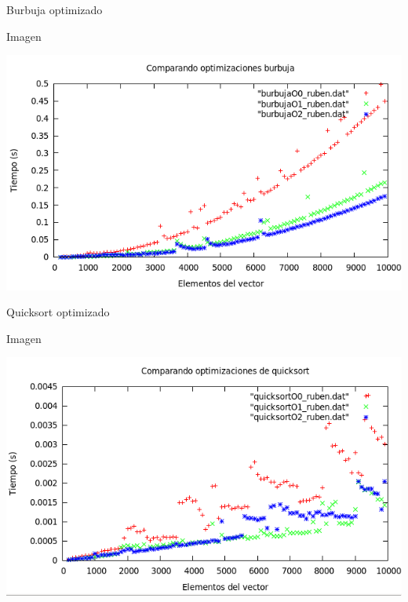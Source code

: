 \documentclass[compress]{beamer}
\begin{document}


\begin{frame}{Burbuja optimizado}
	\begin{alertblock}{Imagen}
	\begin{center}
	\includegraphics[scale=0.45]{../Graficas/Burbuja/burbuja_optimizacion.png}
	\end{center}
	\end{alertblock}
\end{frame}

\begin{frame}{Quicksort optimizado}
	\begin{alertblock}{Imagen}
	\begin{center}
	\includegraphics[scale=0.45]{../Graficas/Quicksort/quicksort_optimizacion.png}	
	\end{center}
	\end{alertblock}
\end{frame}


\end{document}
